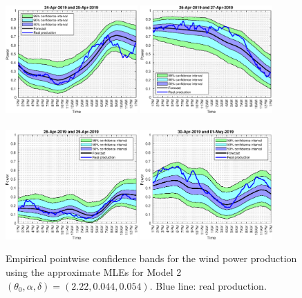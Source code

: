 \documentclass[11pt]{article}
\theoremstyle{definition}
\begin{document}
\begin{figure}[H]
\centering
\includegraphics[width=0.45\textwidth]{plots/bands/1.eps}
\includegraphics[width=0.45\textwidth]{plots/bands/2.eps}\\
\quad\\
\includegraphics[width=0.45\textwidth]{plots/bands/3.eps}
\includegraphics[width=0.45\textwidth]{plots/bands/4.eps}
\caption{Empirical pointwise confidence bands for the wind power production using the approximate MLEs for Model 2 $(\theta_0, \alpha ,\delta)=(2.22,0.044,0.054)$. Blue line: real production.}
\label{fig:confidence_bands}
\end{figure}
\end{document}
